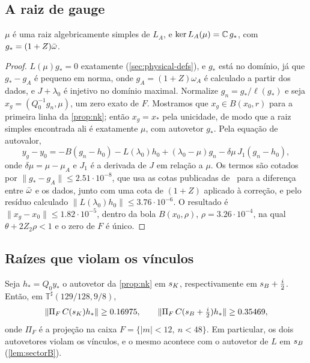 \subsection{A raiz de gauge}\label{sec:roots-gauge}

\begin{proposition}\label{prop:mu}
$\mu$ é uma raiz algebricamente simples de $L_A$, e $\ker L_A(\mu)=\mathbb{C}\,g_*$, com $g_*=(1+Z)\bar\omega$.
\end{proposition}

\begin{proof}
$L(\mu)g_*=0$ exatamente (\cref{sec:physical-defs}), e $g_*$ está no domínio, já que $g_*-g_A$ é pequeno em norma,
onde $g_A=(1+Z)\omega_A$ é calculado a partir dos dados, e $J+\lambda_0$ é injetivo no domínio maximal. Normalize
$g_n=g_*/\ell(g_*)$ e seja $x_g=(Q_0^{-1}g_n,\mu)$, um zero exato de $F$. Mostramos que $x_g\in B(x_0,r)$ para a primeira
linha da \cref{prop:nk}; então $x_g=x_*$ pela unicidade, de modo que a raiz simples encontrada ali é exatamente $\mu$, com
autovetor $g_*$. Pela equação de autovalor,
\[
  y_g-y_0=-B(g_n-h_0)-L(\lambda_0)h_0+(\lambda_0-\mu)g_n-\delta\mu\,J_1(g_n-h_0),
\]
onde $\delta\mu=\mu-\mu_A$ e $J_1$ é a derivada de $J$ em relação a $\mu$. Os termos são cotados por
$\|g_*-g_A\|\le2.51\cdot10^{-8}$, que usa as cotas publicadas de~\cite{RT2019} para a diferença entre
$\bar\omega$ e os dados, junto com uma cota de $(1+Z)$ aplicado à correção, e pelo resíduo calculado
$\|L(\lambda_0)h_0\|\le3.76\cdot10^{-6}$. O resultado é $\|x_g-x_0\|\le1.82\cdot10^{-5}$, dentro da bola $B(x_0,\rho)$, $\rho=3.26\cdot10^{-4}$, na qual
$\theta+2Z_2\rho<1$ e o zero de $F$ é único.
\end{proof}

\subsection{Raízes que violam os vínculos}\label{sec:roots-witness}

\begin{proposition}\label{prop:witness}
Seja $h_*=Q_0y_*$ o autovetor da \cref{prop:nk} em $s_{K}$, respectivamente em $s_{B}+\tfrac i2$. Então, em
$\mathbb T^\sharp(129/128,9/8)$,
\[
  \|\Pi_F\,C(s_{K})h_*\|\ge0.16975,\qquad \|\Pi_F\,C(s_{B}+\tfrac i2)h_*\|\ge0.35469,
\]
onde $\Pi_F$ é a projeção na caixa $F=\{|m|<12,\ n<48\}$. Em particular, os dois autovetores violam os
vínculos, e o mesmo acontece com o autovetor de $L$ em $s_{B}$ (\cref{lem:sectorB}).
\end{proposition}

